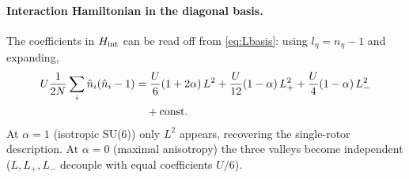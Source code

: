 \documentclass[11pt,a4paper]{article}
\begin{document}
\paragraph{Interaction Hamiltonian in the diagonal basis.}
The coefficients in $H_{\rm int}$ can be read off from \eqref{eq:Lbasis}:
using $l_\eta = n_\eta-1$ and expanding,
\begin{align}
  U\frac{1}{2N}\sum_{i}\hat{n}_i(\hat{n}_i-1)
  &=
  \frac{U}{6}(1+2\alpha)\,L^2
  +\frac{U}{12}(1-\alpha)\,L_+^2
  +\frac{U}{4}(1-\alpha)\,L_-^2 \notag \\
  &\quad + \text{const}.
\end{align}
At $\alpha=1$ (isotropic SU(6)) only $L^2$ appears, recovering the
single-rotor description.
At $\alpha=0$ (maximal anisotropy) the three valleys become independent
($L,L_+,L_-$ decouple with equal coefficients $U/6$).
\end{document}
